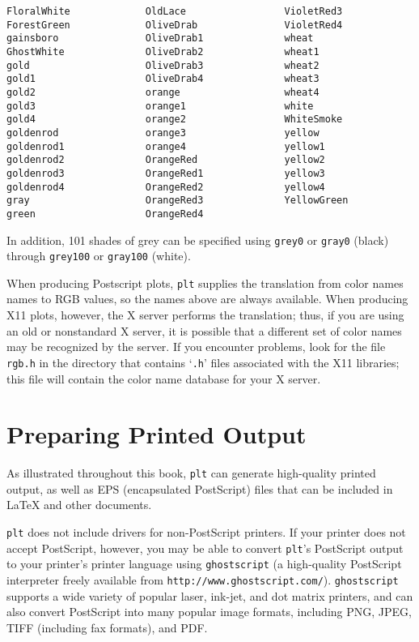 \documentclass{book}
\begin{document}
\begin{verbatim}
FloralWhite             OldLace                 VioletRed3
ForestGreen             OliveDrab               VioletRed4
gainsboro               OliveDrab1              wheat
GhostWhite              OliveDrab2              wheat1
gold                    OliveDrab3              wheat2
gold1                   OliveDrab4              wheat3
gold2                   orange                  wheat4
gold3                   orange1                 white
gold4                   orange2                 WhiteSmoke
goldenrod               orange3                 yellow
goldenrod1              orange4                 yellow1
goldenrod2              OrangeRed               yellow2
goldenrod3              OrangeRed1              yellow3
goldenrod4              OrangeRed2              yellow4
gray                    OrangeRed3              YellowGreen
green                   OrangeRed4
\end{verbatim}

%
In addition, 101 shades of grey can be specified using {\tt grey0} or
{\tt gray0} (black) through {\tt grey100} or {\tt gray100} (white).

When producing Postscript plots, {\tt plt} supplies the translation from color
names names to RGB values, so the names above are always available.  When
producing X11 plots, however, the X server performs the translation; thus, if
you are using an old or nonstandard X server, it is possible that a different
set of color names may be recognized by the server.  If you encounter problems,
look for the file {\tt rgb.h} in the directory that contains `{\tt .h}' files
associated with the X11 libraries;  this file will contain the color name
database for your X server.
%

\chapter{Preparing Printed Output \label{sec:printed-output}}

%
As illustrated throughout this book, {\tt plt} can generate
high-quality printed output, as well as EPS (encapsulated PostScript)
files that can be included in \LaTeX{} and other documents.

{\tt plt} does not include drivers for non-PostScript printers.  If
your printer does not accept PostScript, however, you may be able to
convert {\tt plt}'s PostScript output to your printer's printer
language using {\tt ghostscript} (a high-quality PostScript
interpreter freely available from {\tt http://www.ghostscript.com/}).
{\tt ghostscript} supports a wide variety of popular laser, ink-jet,
and dot matrix printers, and can also convert PostScript into many
popular image formats, including PNG, JPEG, TIFF (including fax
formats), and PDF.
\end{document}
